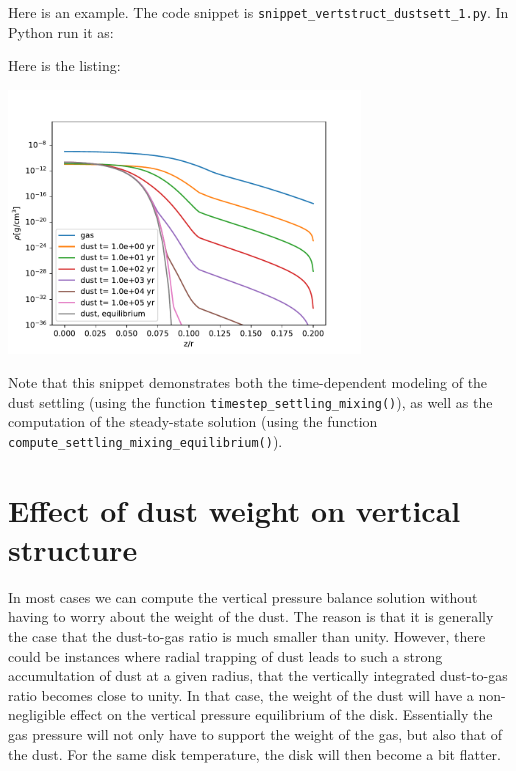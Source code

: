 \documentclass{book}
\newcommand{\code}[1]{{\small\tt #1}}
\begin{document}
Here is an example. The code snippet is
\code{snippet\_vertstruct\_dustsett\_1.py}. In Python run it as:
\begin{codebox}
\end{codebox}
Here is the listing:

\centerline{\includegraphics[width=0.7\textwidth]{../snippets/fig_snippet_vertstruct_dustsett_1_1.pdf}}

Note that this snippet demonstrates both the time-dependent modeling of the
dust settling (using the function \code{timestep\_settling\_mixing()}),
as well as the computation of the steady-state solution
(using the function \code{compute\_settling\_mixing\_equilibrium()}).

\section{Effect of dust weight on vertical structure}
In most cases we can compute the vertical pressure balance solution without
having to worry about the weight of the dust. The reason is that it is generally
the case that the dust-to-gas ratio is much smaller than unity. However, there
could be instances where radial trapping of dust leads to such a strong
accumultation of dust at a given radius, that the vertically integrated
dust-to-gas ratio becomes close to unity. In that case, the weight of the dust
will have a non-negligible effect on the vertical pressure equilibrium of the
disk. Essentially the gas pressure will not only have to support the weight of
the gas, but also that of the dust. For the same disk temperature, the disk will
then become a bit flatter.
\end{document}
